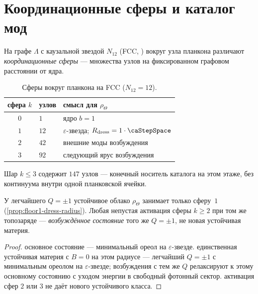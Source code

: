 \section{Координационные сферы и каталог мод}
\label{sec:floor1-shell-catalog}

На графе $\Lambda$ с каузальной звездой $N_{12}$ (FCC, )
вокруг узла планкона различают \emph{координационные сферы} --- множества узлов
на фиксированном графовом расстоянии от ядра.

\begin{table}[htbp]
  \centering
  \caption{Сферы вокруг планкона на FCC ($N_{12}=12$).}
  \label{tab:floor1-shells}
  \begin{tabular}{@{}cll@{}}
    \toprule
    сфера $k$ & узлов & смысл для $\rho_\Theta$ \\
    \midrule
    $0$ & $1$ & ядро $b=1$ \\
    $1$ & $12$ & $\varepsilon$-звезда; $R_{\mathrm{dress}}=1\cdot\caStepSpace$ \\
    $2$ & $42$ & внешние моды возбуждения \\
    $3$ & $92$ & следующий ярус возбуждения \\
    \bottomrule
  \end{tabular}
\end{table}

Шар $k\le 3$ содержит $147$ узлов --- конечный носитель каталога на этом этаже,
без континуума внутри одной планковской ячейки.

\begin{proposition}
\label{prop:floor1-shell-modes}
У легчайшего $Q=\pm1$ устойчивое облако $\rho_\Theta$ занимает только сферу~$1$
(\cref{prop:floor1-dress-radius}).
Любая непустая активация сферы $k\ge 2$ при том же топозаряде --- \emph{возбуждённое состояние}
того же $Q=\pm1$, не новая устойчивая материя.
\end{proposition}

\begin{proof}
основное состояние --- минимальный ореол на $\varepsilon$-звезде.
единственная устойчивая материя с $B=0$ на этом радиусе --- легчайший $Q=\pm1$
с минимальным ореолом на $\varepsilon$-звезде;
возбуждения с тем же $Q$ релаксируют к этому основному состоянию с уходом энергии
в свободный фотонный сектор.
\phence активация сфер $2$ или $3$ не даёт нового устойчивого класса.
\end{proof}

